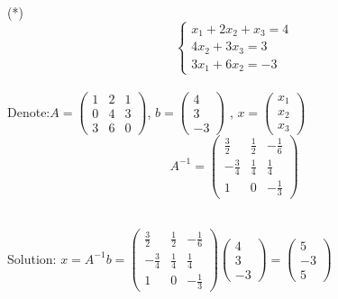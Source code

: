 \documentclass[]{article}
\begin{document}
(*)
\[\begin{cases} x_1 + 2x_2 +x_3= 4\\ 4x_2 + 3x_3 = 3\\3x_1 + 6x_2 = -3 \end{cases}\]\\[2\baselineskip]Denote:\(A=\begin{pmatrix} 1 & 2 & 1\\ 0 & 4 & 3 \\ 3 & 6 & 0\end{pmatrix}\),
\(b=\begin{pmatrix} 4\\ 3 \\-3\end{pmatrix}\) ,
\(x=\begin{pmatrix} x_1\\ x_2 \\x_3\end{pmatrix}\)\\

\[A^{-1}=\begin{pmatrix} \frac{3}{2}&   \frac{1}{2} &   -\frac{1}{6}\\ -\frac{3}{4} &   \frac{1}{4} &   \frac{1}{4} \\ 1 &   0 &   -\frac{1}{3} \end{pmatrix}\]\\
 \hspace{3cm}

Solution:
\(x=A^{-1}b=\begin{pmatrix} \frac{3}{2}& \frac{1}{2} & -\frac{1}{6}\\ -\frac{3}{4} & \frac{1}{4} & \frac{1}{4} \\ 1 & 0 & -\frac{1}{3} \end{pmatrix}\)\(\begin{pmatrix} 4\\ 3\\ -3 \end{pmatrix}=\begin{pmatrix} 5\\ -3\\ 5 \end{pmatrix}\)\\
 \newpage

\begingroup
\end{document}
